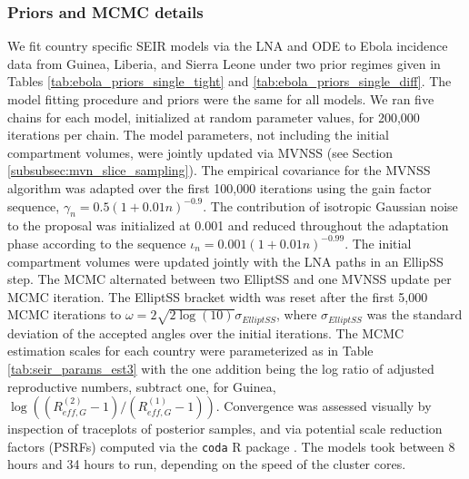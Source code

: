 \subsubsection{Priors and MCMC details}
\label{subsubsec:ebola_single_mcmc}

We fit country specific SEIR models via the LNA and ODE to Ebola incidence data from Guinea, Liberia, and Sierra Leone under two prior regimes given in Tables \ref{tab:ebola_priors_single_tight} and \ref{tab:ebola_priors_single_diff}. The model fitting procedure and priors were the same for all models. We ran five chains for each model, initialized at random parameter values, for 200,000 iterations per chain. The model parameters, not including the initial compartment volumes, were jointly updated via MVNSS (see Section \ref{subsubsec:mvn_slice_sampling}). The empirical covariance for the MVNSS algorithm was adapted over the first 100,000 iterations using the gain factor sequence, $\gamma_n = 0.5(1 + 0.01n)^{-0.9}$. The contribution of isotropic Gaussian noise to the proposal was initialized at 0.001 and reduced throughout the adaptation phase according to the sequence $ \iota_n = 0.001(1 + 0.01n)^{-0.99} $. The initial compartment volumes were updated jointly with the LNA paths in an EllipSS step. The MCMC alternated between two ElliptSS and one MVNSS update per MCMC iteration. The ElliptSS bracket width was reset after the first 5,000 MCMC iterations to $ \omega = 2\sqrt{2\log(10)}\sigma_{ElliptSS}$, where $ \sigma_{ElliptSS} $ was the standard deviation of the accepted angles over the initial iterations. The MCMC estimation scales for each country were parameterized as in Table \ref{tab:seir_params_est3} with the one addition being the log ratio of adjusted reproductive numbers, subtract one, for Guinea, $ \log\left ((R_{eff,G}^{(2)}-1)/(R_{eff,G}^{(1)}-1)\right ) $. Convergence was assessed visually by inspection of traceplots of posterior samples, and via potential scale reduction factors (PSRFs) \cite{brooks1998general} computed via the \texttt{coda} R package \cite{codapackage}. The models took between 8 hours and 34 hours to run, depending on the speed of the cluster cores. 

